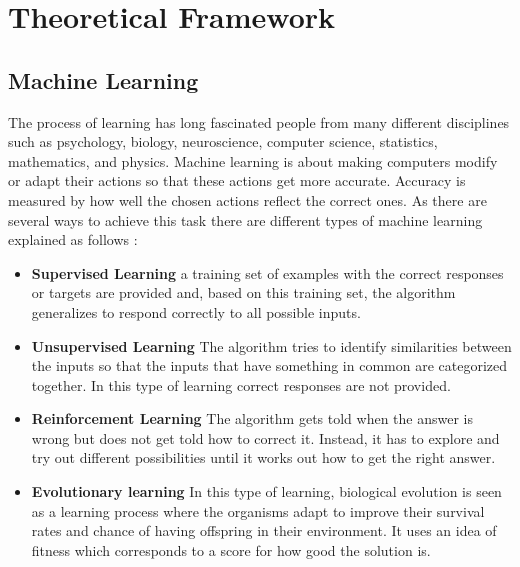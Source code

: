 \chapter{Theoretical Framework}
\label{ch:theosm}



\section{Machine Learning}
The process of learning has long fascinated people from many different disciplines such as psychology, biology, neuroscience, computer science, statistics, mathematics, and physics. 
Machine learning is about making computers modify or adapt their actions so that these actions get more accurate. Accuracy is measured by how well the chosen actions reflect the correct ones. As there are several ways to achieve this task there are different types of machine learning explained as follows \cite{marsland2015machine}:

\begin{itemize}
\item \textbf{Supervised Learning} a training set of examples with the correct responses or targets are provided and, based on this training set, the algorithm generalizes to respond correctly to all possible inputs.

\item \textbf{Unsupervised Learning} The algorithm tries to identify similarities between the inputs so that the inputs that have something in common are categorized together. In this type of learning correct responses are not provided.

\item \textbf{Reinforcement Learning} The algorithm gets told when the answer is wrong but does not get told how to correct it. Instead, it has to explore and try out different possibilities until it works out how to get the right answer. 

\item \textbf{Evolutionary learning} In this type of learning, biological evolution is seen as a learning process where the organisms adapt to improve their survival rates and chance of having offspring in their environment. It uses an idea of fitness which corresponds to a score for how good the solution is. 
\end{itemize}

